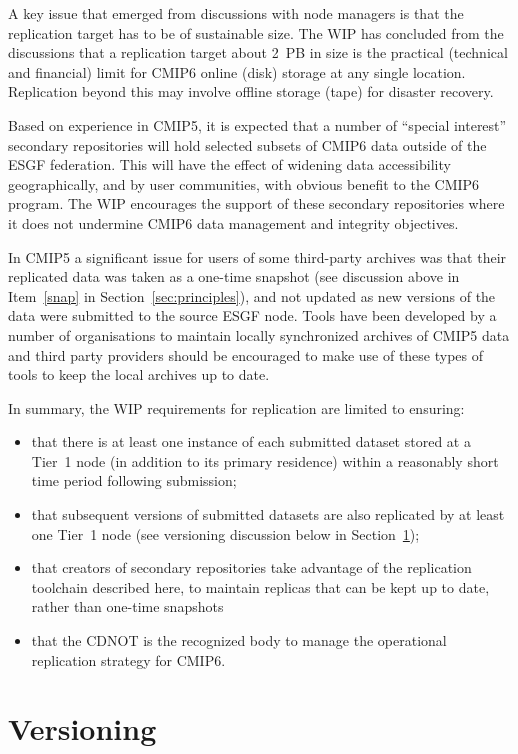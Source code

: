 \documentclass[gmd,manuscript]{copernicus}
\newcommand{\secref}[1] {\mbox{Section  \ref{sec:#1}}}
\begin{document}
A key issue that emerged from discussions with node managers is that
the replication target has to be of sustainable size. The WIP has
concluded from the discussions that a replication target about 2~PB in
size is the practical (technical and financial) limit for CMIP6 online
(disk) storage at any single location. Replication beyond this may
involve offline storage (tape) for disaster recovery.

Based on experience in CMIP5, it is expected that a number of
``special interest'' secondary repositories will hold selected subsets
of CMIP6 data outside of the ESGF federation. This will have the
effect of widening data accessibility geographically, and by user
communities, with obvious benefit to the CMIP6 program. The WIP
encourages the support of these secondary repositories where it
does not undermine CMIP6 data management and integrity objectives.

In CMIP5 a significant issue for users of some third-party archives
was that their replicated data was taken as a one-time snapshot (see
discussion above in Item~\ref{snap} in \secref{principles}), and not
updated as new versions of the data were submitted to the source ESGF
node. Tools have been developed by a number of organisations to
maintain locally synchronized archives of CMIP5 data and third party
providers should be encouraged to make use of these types of tools to
keep the local archives up to date.

In summary, the WIP requirements for replication are limited to
ensuring:

\begin{itemize}
\item that there is at least one instance of each submitted dataset
  stored at a Tier~1 node (in addition to its primary residence)
  within a reasonably short time period following submission;
\item that subsequent versions of submitted datasets are also
  replicated by at least one Tier~1 node (see versioning discussion
  below in \secref{version});
\item that creators of secondary repositories take advantage of the
  replication toolchain described here, to maintain replicas that can
  be kept up to date, rather than one-time snapshots
\item that the CDNOT is the recognized body to manage the operational
  replication strategy for CMIP6.
\end{itemize}

\section{Versioning}
\label{sec:version}
\end{document}
